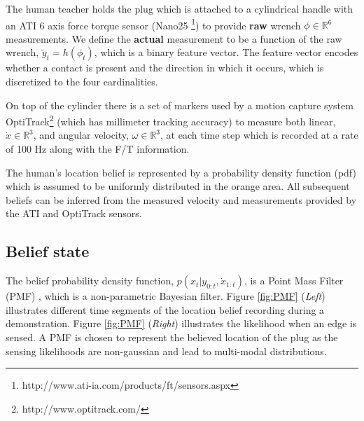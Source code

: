 \documentclass[final,5p,times,twocolumn]{elsarticle}
\begin{document}
The human teacher holds the plug which is attached to a cylindrical handle with 
an ATI 6 axis force torque sensor (Nano25 \footnote{http://www.ati-ia.com/products/ft/sensors.aspx}) 
to provide \textbf{raw} wrench $\phi \in \mathbb{R}^6$ measurements. We define the \textbf{actual} measurement 
to be a function of the raw wrench, $\tilde{y}_t = h(\phi_t)$, which is a binary feature vector. The feature vector encodes whether a contact is present 
and the direction in which it occurs, which is discretized to the four cardinalities.

On top of the cylinder there is a set of markers used by a motion capture system 
OptiTrack\footnote{http://www.optitrack.com/} (which has millimeter tracking accuracy) to measure 
both linear, $\dot{x} \in \mathbb{R}^3$, and angular velocity, $\omega \in \mathbb{R}^3$, at each 
time step which is recorded at a rate of 100 Hz along with the F/T information.

The human's location belief is represented by a probability density function (pdf) which 
is assumed to be uniformly distributed in the orange area. All subsequent beliefs can 
be inferred from the measured velocity and measurements provided by the ATI and OptiTrack sensors.

\subsection{Belief state}

The belief probability density function,  $p(x_t|y_{0:t},\dot{x}_{1:t})$, is a Point Mass Filter (PMF) 
\cite[p.87]{Bergman99recursivebayesian}, which is a non-parametric  Bayesian filter.
Figure \ref{fig:PMF} (\textit{Left}) illustrates different time segments of the location belief recording
during a demonstration. Figure \ref{fig:PMF} (\textit{Right}) illustrates the likelihood when an edge is sensed. 
A PMF is chosen to represent the believed location of the plug as the sensing likelihoods are non-gaussian and 
lead to multi-modal distributions. 
\end{document}
